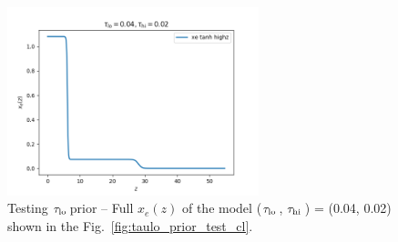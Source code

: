 \documentclass[prd,amsmath,amssymb,floatfix,superscriptaddress,nofootinbib]{revtex4-1}
\newcommand{\tauhi}{$\tau_{\rm hi}\,$}
\newcommand{\taulo}{$\tau_{\rm lo}\,$}
\begin{document}
\begin{figure}
\includegraphics[width=0.65\textwidth]{cosmomc_kde/taulo_prior_test/plot_xez_taulo_0p04_tauhi_0p02.png}
\caption{Testing \taulo prior -- Full $x_e(z)$ of the model (\taulo, \tauhi) = (0.04, 0.02) shown in the Fig.~\ref{fig:taulo_prior_test_cl}. 
}
\label{fig:tau_lo_prior_test_xe}
\end{figure}



\end{document}
